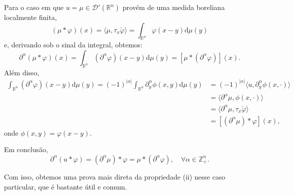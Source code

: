 \documentclass[../distribution_theory_notes.tex]{subfiles}
\begin{document}
\begin{prop*}
	Para o caso em que \(u = \mu \in \mathcal{D}'(\mathbb{R}^{n})\) provém de uma medida boreliana localmente finita,
	\[
		(\mu *\varphi )(x) = \langle \mu , \tau_{x}\check{\varphi } \rangle = \int_{\mathbb{R}^{n}}^{}\varphi (x-y) \mathrm{d}\mu(y)
	\]
	e, derivando sob o sinal da integral, obtemos:
	\[
		\partial^{\alpha }(\mu *\varphi )(x)=\int_{\mathbb{R}^{n}}^{}(\partial^{\alpha }\varphi )(x-y) \mathrm{d}\mu (y) = [\mu *(\partial^{\alpha }\varphi )](x).
	\]
	Além disso,
	\begin{align*}
		\int_{\mathbb{R}^{n}}^{}(\partial^{\alpha }\varphi )(x-y) \mathrm{d}\mu (y) = (-1)^{| \alpha  |}\int_{\mathbb{R}^{n}}^{}\partial_{y}^{\alpha }\phi(x, y) \mathrm{d}\mu (y) & = (-1)^{| \alpha  |}\langle u, \partial_{y}^{\alpha }\phi(x, \cdot ) \rangle \\
		                                                                                                                                                                           & = \langle \partial^{\alpha }\mu , \phi(x, \cdot ) \rangle                    \\
		                                                                                                                                                                           & = \langle \partial^{\alpha }\mu , \tau_{x}\check{\varphi } \rangle           \\
		                                                                                                                                                                           & = [(\partial^{\alpha }\mu )*\varphi ](x),
	\end{align*}
	onde \(\phi(x, y)=\varphi (x-y)\).

	Em conclusão,
	\[
		\partial^{\alpha }(u*\varphi ) = (\partial^{\alpha }\mu )*\varphi  = \mu *(\partial^{\alpha }\varphi ), \quad \forall \alpha \in \mathbb{Z}_{+}^{n}.
	\]
\end{prop*}

Com isso, obtemos uma prova mais direta da propriedade (ii) nesse caso particular, que é bastante útil e comum.
\end{document}
